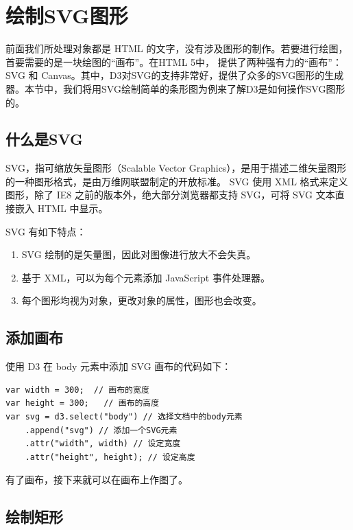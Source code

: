 \section{绘制SVG图形}

前面我们所处理对象都是 HTML 的文字，没有涉及图形的制作。若要进行绘图，首要需要的是一块绘图的``画布''。在HTML 5中， 提供了两种强有力的``画布''：SVG 和 Canvas。其中，D3对SVG的支持非常好，提供了众多的SVG图形的生成器。本节中，我们将用SVG绘制简单的条形图为例来了解D3是如何操作SVG图形的。

\subsection{什么是SVG}

SVG，指可缩放矢量图形（Scalable Vector Graphics），是用于描述二维矢量图形的一种图形格式，是由万维网联盟制定的开放标准。 SVG 使用 XML 格式来定义图形，除了 IE8 之前的版本外，绝大部分浏览器都支持 SVG，可将 SVG 文本直接嵌入 HTML 中显示。

SVG 有如下特点：

\begin{enumerate}
    \item SVG 绘制的是矢量图，因此对图像进行放大不会失真。
    \item 基于 XML，可以为每个元素添加 JavaScript 事件处理器。
    \item 每个图形均视为对象，更改对象的属性，图形也会改变。
\end{enumerate}

\subsection{添加画布}

使用 D3 在 body 元素中添加 SVG 画布的代码如下：

\begin{verbatim}
var width = 300;  // 画布的宽度
var height = 300;   // 画布的高度
var svg = d3.select("body") // 选择文档中的body元素
    .append("svg") // 添加一个SVG元素
    .attr("width", width) // 设定宽度
    .attr("height", height); // 设定高度
\end{verbatim}

有了画布，接下来就可以在画布上作图了。

\subsection{绘制矩形}

